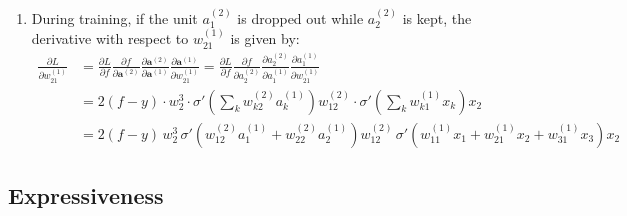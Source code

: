 \documentclass[a4paper, 10pt]{article}
\begin{document}
\begin{enumerate}[label=(\alph*)]
    \item During training, if the unit $a_1^{(2)}$ is dropped out while $a_2^{(2)}$ is kept, the derivative with respect to $w_{21}^{(1)}$ is given by:
    \begin{equation}
        \begin{aligned}
            \frac{\partial L}{\partial w_{21}^{(1)}} &= \frac{\partial L}{\partial f} \frac{\partial f}{\partial \mathbf{a}^{(2)}} \frac{\partial \mathbf{a}^{(2)}}{\partial \mathbf{a}^{(1)}} \frac{\partial \mathbf{a}^{(1)}}{\partial w_{21}^{(1)}} = \frac{\partial L}{\partial f} \frac{\partial f}{\partial a_2^{(2)}} \frac{\partial a_2^{(2)}}{\partial a_{1}^{(1)}} \frac{\partial a_1^{(1)}}{\partial w_{21}^{(1)}} \\ 
            &= 2(f-y) \cdot w_2^{3} \cdot \sigma'\left(\sum_k w_{k2}^{(2)} a_k^{(1)}\right) w_{12}^{(2)} \cdot \sigma'\left( \sum_k w_{k1}^{(1)} x_k \right) x_2 \\ 
            &= 2(f-y) \, w_2^{3} \, \sigma'\left(w_{12}^{(2)} a_1^{(1)} + w_{22}^{(2)} a_2^{(1)}\right) w_{12}^{(2)} \, \sigma'\left( w_{11}^{(1)} x_1 + w_{21}^{(1)} x_2 + w_{31}^{(1)} x_3 \right) x_2
        \end{aligned}
    \end{equation}
\end{enumerate}

\subsection{Expressiveness}
\end{document}
